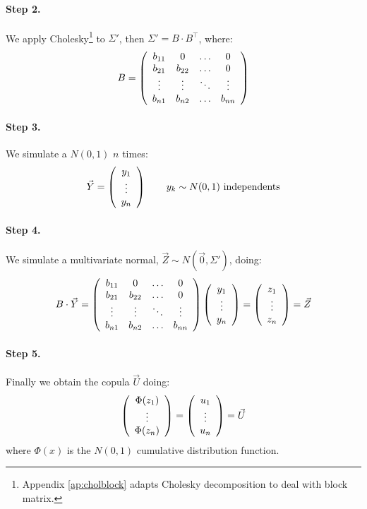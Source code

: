 \documentclass[a4paper,12pt,final]{article}
\begin{document}
\paragraph{Step 2.} We apply Cholesky\footnote{Appendix \ref{ap:cholblock} adapts Cholesky 
decomposition to deal with block matrix.} to $\Sigma'$, then $\Sigma' = B \cdot B^{\top}$, 
where:
\begin{displaymath}
B = 
\left(
\begin{array}{cccc}
b_{11}   & 0        & \ldots & 0       \cr
b_{21}   & b_{22}   & \ldots & 0       \cr
\vdots  & \vdots  & \ddots & \vdots \cr
b_{n1}   & b_{n2}   & \ldots & b_{nn}
\end{array}
\right)
\end{displaymath}

\paragraph{Step 3.} We simulate a $N(0,1)$ $n$ times:
\begin{displaymath}
\vec{Y} =
\left(
\begin{array}{c}
y_1 \cr
\vdots \cr
y_n
\end{array}
\right) 
\qquad y_k \sim N(0,1) \textrm{ independents}
\end{displaymath}

\paragraph{Step 4.} We simulate a multivariate normal, $\vec{Z} \sim N(\vec{0}, \Sigma')$, 
doing:
\begin{displaymath}
B \cdot \vec{Y} 
=
\left(
\begin{array}{cccc}
b_{11}   & 0        & \ldots & 0       \cr
b_{21}   & b_{22}   & \ldots & 0       \cr
\vdots  & \vdots  & \ddots & \vdots \cr
b_{n1}   & b_{n2}   & \ldots & b_{nn}
\end{array}
\right)
\left(
\begin{array}{c}
y_1 \cr
\vdots \cr
y_n
\end{array}
\right) 
=
\left(
\begin{array}{c}
z_1 \cr
\vdots \cr
z_n
\end{array}
\right) 
= 
\vec{Z}
\end{displaymath}

\paragraph{Step 5.} Finally we obtain the copula $\vec{U}$ doing:
\begin{displaymath}
\left(
\begin{array}{c}
\Phi(z_1) \cr
\vdots \cr
\Phi(z_n)
\end{array}
\right) 
=
\left(
\begin{array}{c}
u_1 \cr
\vdots \cr
u_n
\end{array}
\right) 
=
\vec{U} 
\end{displaymath}
where $\Phi(x)$ is the $N(0,1)$ cumulative distribution function.
\end{document}
